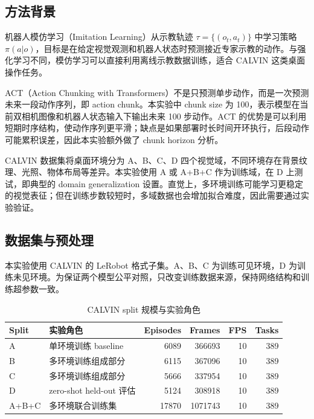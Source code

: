 \documentclass[12pt,a4paper]{ctexart}
\begin{document}
\subsection{方法背景}

机器人模仿学习（Imitation Learning）从示教轨迹 $\tau=\{(o_t,a_t)\}$ 中学习策略 $\pi(a|o)$，目标是在给定视觉观测和机器人状态时预测接近专家示教的动作。与强化学习不同，模仿学习可以直接利用离线示教数据训练，适合 CALVIN 这类桌面操作任务。

ACT（Action Chunking with Transformers）不是只预测单步动作，而是一次预测未来一段动作序列，即 action chunk。本实验中 chunk size 为 100，表示模型在当前双相机图像和机器人状态输入下输出未来 100 步动作。ACT 的优势是可以利用短期时序结构，使动作序列更平滑；缺点是如果部署时长时间开环执行，后段动作可能累积误差，因此本实验额外做了 chunk horizon 分析。

CALVIN 数据集将桌面环境分为 A、B、C、D 四个视觉域，不同环境存在背景纹理、光照、物体布局等差异。本实验使用 A 或 A+B+C 作为训练域，在 D 上测试，即典型的 domain generalization 设置。直觉上，多环境训练可能学习更稳定的视觉表征；但在训练步数较短时，多域数据也会增加拟合难度，因此需要通过实验验证。

\subsection{数据集与预处理}

本实验使用 CALVIN 的 LeRobot 格式子集。A、B、C 为训练可见环境，D 为训练未见环境。为保证两个模型公平对照，只改变训练数据来源，保持网络结构和训练超参数一致。

\begin{table}[H]
    \centering
    \caption{CALVIN split 规模与实验角色}
    \begin{tabular}{llrrrr}
        \toprule
        Split & 实验角色 & Episodes & Frames & FPS & Tasks \\
        \midrule
        A & 单环境训练 baseline & 6089 & 366693 & 10 & 389 \\
        B & 多环境训练组成部分 & 6115 & 367096 & 10 & 389 \\
        C & 多环境训练组成部分 & 5666 & 337954 & 10 & 389 \\
        D & zero-shot held-out 评估 & 5124 & 308918 & 10 & 389 \\
        A+B+C & 多环境联合训练集 & 17870 & 1071743 & 10 & 389 \\
        \bottomrule
    \end{tabular}
\end{table}
\end{document}

